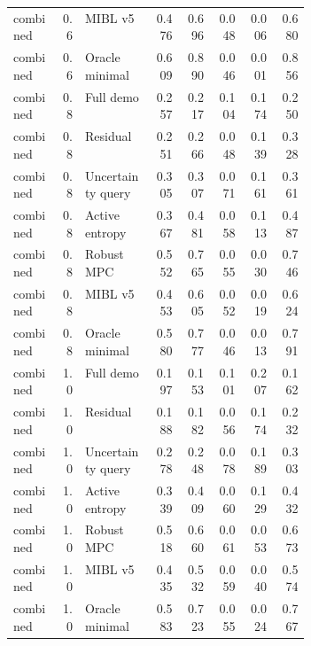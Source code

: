 \documentclass{article}
\begin{document}
\begin{center}
\begin{longtable}{p{0.16\linewidth}rp{0.23\linewidth}rrrrr}
combined & 0.6 & MIBL v5 & 0.476 & 0.696 & 0.048 & 0.006 & 0.680\\
combined & 0.6 & Oracle minimal & 0.609 & 0.890 & 0.046 & 0.001 & 0.856\\
combined & 0.8 & Full demo & 0.257 & 0.217 & 0.104 & 0.174 & 0.250\\
combined & 0.8 & Residual & 0.251 & 0.266 & 0.048 & 0.139 & 0.328\\
combined & 0.8 & Uncertainty query & 0.305 & 0.307 & 0.071 & 0.161 & 0.361\\
combined & 0.8 & Active entropy & 0.367 & 0.481 & 0.058 & 0.113 & 0.487\\
combined & 0.8 & Robust MPC & 0.552 & 0.765 & 0.055 & 0.030 & 0.746\\
combined & 0.8 & MIBL v5 & 0.453 & 0.605 & 0.052 & 0.019 & 0.624\\
combined & 0.8 & Oracle minimal & 0.580 & 0.777 & 0.046 & 0.013 & 0.791\\
combined & 1.0 & Full demo & 0.197 & 0.153 & 0.101 & 0.207 & 0.162\\
combined & 1.0 & Residual & 0.188 & 0.182 & 0.056 & 0.174 & 0.232\\
combined & 1.0 & Uncertainty query & 0.278 & 0.248 & 0.078 & 0.189 & 0.303\\
combined & 1.0 & Active entropy & 0.339 & 0.409 & 0.060 & 0.129 & 0.432\\
combined & 1.0 & Robust MPC & 0.518 & 0.660 & 0.061 & 0.053 & 0.673\\
combined & 1.0 & MIBL v5 & 0.435 & 0.532 & 0.059 & 0.040 & 0.574\\
combined & 1.0 & Oracle minimal & 0.583 & 0.723 & 0.055 & 0.024 & 0.767\\
\bottomrule
\end{longtable}
\normalsize
\end{center}
\end{document}
